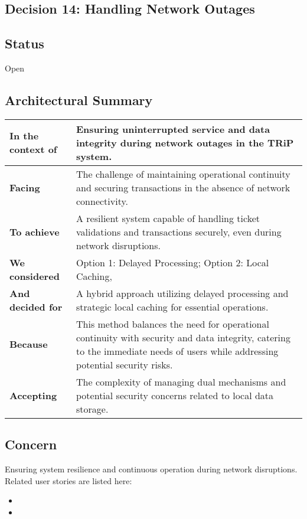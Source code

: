 \subsection{Decision 14: Handling Network Outages}

\subsection*{Status}
Open

\subsection*{Architectural Summary}
\begin{tabular}{|p{3.5cm}|p{10.5cm}|}
    \hline
    \textbf{In the context of} & Ensuring uninterrupted service and data integrity during network outages in the TRiP system. \\
    \hline
    \textbf{Facing} & The challenge of maintaining operational continuity and securing transactions in the absence of network connectivity. \\
    \hline
    \textbf{To achieve} & A resilient system capable of handling ticket validations and transactions securely, even during network disruptions. \\
    \hline
    \textbf{We considered} & Option 1: Delayed Processing; Option 2: Local Caching, \\
    \hline
    \textbf{And decided for} & A hybrid approach utilizing delayed processing and strategic local caching for essential operations. \\
    \hline
    \textbf{Because} & This method balances the need for operational continuity with security and data integrity, catering to the immediate needs of users while addressing potential security risks. \\
    \hline
    \textbf{Accepting} & The complexity of managing dual mechanisms and potential security concerns related to local data storage. \\
    \hline
\end{tabular}

\subsection*{Concern}
Ensuring system resilience and continuous operation during network disruptions.
Related user stories are listed here:
\begin{itemize}[noitemsep]
    \item \userStoryThirtyNine
    \item \userStoryForty
\end{itemize}

